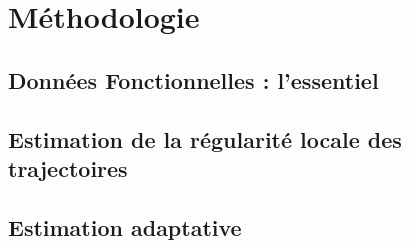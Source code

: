 \chapter{Méthodologie}
\minitoc%

\section{Données Fonctionnelles : l'essentiel}



\section{Estimation de la régularité locale des trajectoires}



\section{Estimation adaptative}
\label{sec:lissage_adapt}

